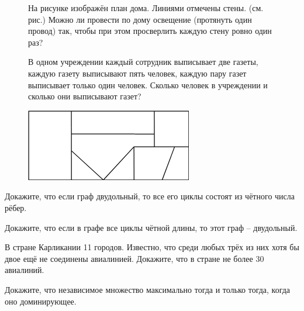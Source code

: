 \begin{figure}[H]
\begin{minipage}{0.6\linewidth}
    \begin{thm}
        На рисунке изображён план дома. Линиями отмечены стены. (см. рис.) Можно ли провести по дому освещение (протянуть один провод) так, чтобы при этом просверлить каждую стену ровно один раз?
    \end{thm}
    \begin{thm}
        В одном учреждении каждый сотрудник выписывает две газеты, каждую газету выписывают пять человек, каждую пару газет выписывает только один человек. Сколько человек в учреждении и сколько они выписывают газет?
    \end{thm}
\end{minipage}
    \hfill
\begin{minipage}{0.39\linewidth}
    \includegraphics[width=0.95\columnwidth]{img/10.4.0 img2.png}
\end{minipage}
\end{figure}

\begin{thm}
    Докажите, что если граф двудольный, то все его циклы состоят из чётного числа рёбер.
\end{thm}

\begin{thm}
    Докажите, что если в графе все циклы чётной длины, то этот граф -- двудольный.
\end{thm}

\begin{thm}
    В стране Карликании 11 городов. Известно, что среди любых трёх из них хотя бы двое ещё не соединены авиалинией. Докажите, что в стране не более 30 авиалиний.
\end{thm}

\begin{thm}
    Докажите, что независимое множество максимально тогда и только тогда, когда оно доминирующее.
\end{thm}

